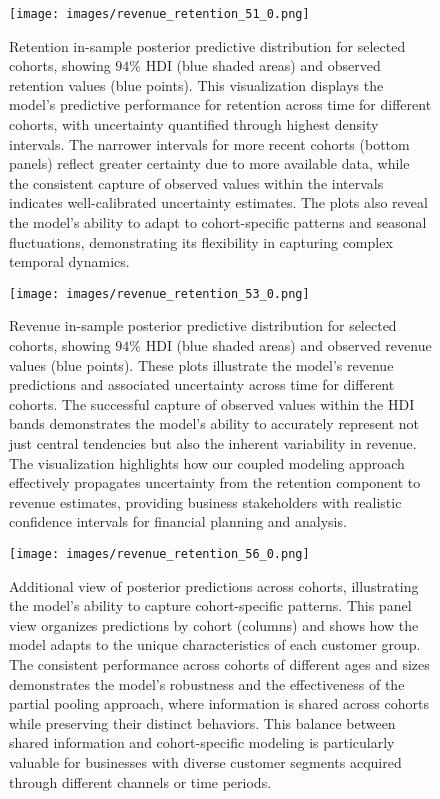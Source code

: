 \documentclass[11pt]{amsart}
\theoremstyle{definition}
\begin{document}
\begin{figure}
    \centering
    \texttt{[image: images/revenue\_retention\_51\_0.png]}
    \caption{Retention in-sample posterior predictive distribution for selected cohorts, showing $94\%$ HDI (blue shaded areas)
        and observed retention values (blue points). This visualization displays the model's predictive performance for
        retention across time for different cohorts, with uncertainty quantified through highest density intervals.
        The narrower intervals for more recent cohorts (bottom panels) reflect greater certainty due to more available
        data, while the consistent capture of observed values within the intervals indicates well-calibrated uncertainty
        estimates. The plots also reveal the model's ability to adapt to cohort-specific patterns and seasonal
        fluctuations, demonstrating its flexibility in capturing complex temporal dynamics.}
    \label{fig:in_sample_retention}
\end{figure}

\begin{figure}
    \centering
    \texttt{[image: images/revenue\_retention\_53\_0.png]}
    \caption{Revenue in-sample posterior predictive distribution for selected cohorts, showing $94\%$ HDI (blue shaded areas)
        and observed revenue values (blue points). These plots illustrate the model's revenue predictions and associated
        uncertainty across time for different cohorts. The successful capture of observed values within the HDI bands
        demonstrates the model's ability to accurately represent not just central tendencies but also the inherent
        variability in revenue. The visualization highlights how our coupled modeling approach effectively propagates
        uncertainty from the retention component to revenue estimates, providing business stakeholders with realistic
        confidence intervals for financial planning and analysis.}
    \label{fig:in_sample_revenue}
\end{figure}

\begin{figure}
    \texttt{[image: images/revenue\_retention\_56\_0.png]}
    \caption{Additional view of posterior predictions across cohorts, illustrating the model's ability to capture
        cohort-specific patterns. This panel view organizes predictions by cohort (columns) and shows how the model
        adapts to the unique characteristics of each customer group. The consistent performance across cohorts of
        different ages and sizes demonstrates the model's robustness and the effectiveness of the partial pooling
        approach, where information is shared across cohorts while preserving their distinct behaviors. This balance
        between shared information and cohort-specific modeling is particularly valuable for businesses with diverse
        customer segments acquired through different channels or time periods.}
    \label{fig:additional_predictions}
\end{figure}
\end{document}
